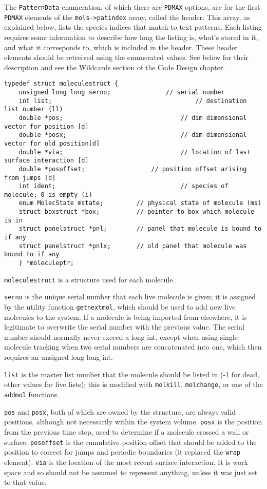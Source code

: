 \documentclass {book}
\begin{document}
The \texttt{PatternData} enumeration, of which there are \texttt{PDMAX} options, are for the first \texttt{PDMAX} elements of the \texttt{mols->patindex} array, called the header.  This array, as explained below, lists the species indices that match to text patterns.  Each listing requires some information to describe how long the listing is, what's stored in it, and what it corresponds to, which is included in the header.  These header elements should be retreived using the enumerated values.  See below for their description and see the Wildcards section of the Code Design chapter.

\begin{lstlisting}
typedef struct moleculestruct {
	unsigned long long serno;				// serial number
	int list;										// destination list number (ll)
	double *pos;								// dim dimensional vector for position [d]
	double *posx;								// dim dimensional vector for old position[d]
	double *via;								// location of last surface interaction [d]
	double *posoffset;					// position offset arising from jumps [d]
	int ident;									// species of molecule; 0 is empty (i)
	enum MolecState mstate;			// physical state of molecule (ms)
	struct boxstruct *box;			// pointer to box which molecule is in
	struct panelstruct *pnl;		// panel that molecule is bound to if any
	struct panelstruct *pnlx;		// old panel that molecule was bound to if any
	} *moleculeptr;
\end{lstlisting}

\texttt{moleculestruct} is a structure used for each molecule.

\texttt{serno} is the unique serial number that each live molecule is given; it is assigned by the utility function \texttt{getnextmol}, which should be used to add new live molecules to the system.  If a molecule is being imported from elsewhere, it is legitimate to overwrite the serial number with the previous value.  The serial number should normally never exceed a long int, except when using single molecule tracking when two serial numbers are concatenated into one, which then requires an unsigned long long int.

\texttt{list} is the master list number that the molecule should be listed in (-1 for dead, other values for live lists); this is modified with \texttt{molkill}, \texttt{molchange}, or one of the \texttt{addmol} functions.

\texttt{pos} and \texttt{posx}, both of which are owned by the structure, are always valid positions, although not necessarily within the system volume.  \texttt{posx} is the position from the previous time step, used to determine if a molecule crossed a wall or surface.  \texttt{posoffset} is the cumulative position offset  that should be added to the position to correct for jumps and periodic boundaries (it replaced the \texttt{wrap} element).  \texttt{via} is the location of the most recent surface interaction. It is work space and so should not be assumed to represent anything, unless it was just set to that value.
\end{document}

